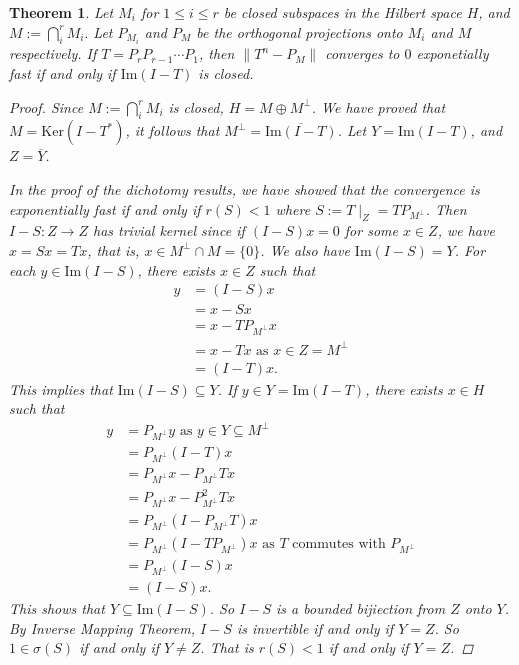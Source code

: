 \documentclass[11pt, a4paper]{amsart}
\newtheorem{theorem}{Theorem}
\begin{document}
\begin{theorem}
Let $M_i$ for $1\leq i\leq r$ be closed subspaces in the Hilbert space $H$, and $M:=\bigcap_{i}^r M_i.$ Let $P_{M_i}$ and $P_{M}$ be the orthogonal projections onto $M_i$ and $M$ respectively. If $T=P_rP_{r-1}\cdots P_1$, then $\|T^n-P_M\|$ converges to $0$ exponetially fast if and only if $\mathrm{Im}(I-T)$ is closed.
\begin{proof}
Since $M:=\bigcap_{i}^r M_i$ is closed, $H=M\oplus M^{\perp}$. We have proved that $M=\mathrm{Ker}(I-T^{\ast})$, it follows that $M^{\perp}=\overline{\mathrm{Im}(I-T)}$. Let $	Y=\mathrm{Im}(I-T)$, and $Z=\overline{Y}$.

In the proof of the \emph{dichotomy results}, we have showed that the convergence is exponentially fast if and only if $r(S)<1$ where $S:=T\mid_{Z}=TP_{M^{\perp}}$.
Then $I-S\colon Z\to Z$ has trivial kernel since if
$(I-S)x=0$ for some $x\in Z$, we have $x=Sx=Tx$, that is, $x\in M^{\perp}\cap M=\{0\}$. 
We also have $\mathrm{Im}(I-S)=Y$. For each $y\in \mathrm{Im}(I-S)$, there exists $x\in Z$ such that 
\begin{align*}
y&=(I-S)x\\
{}&=x-Sx \\
{}&=x-TP_{M^{\perp}}x \\
{}&=x-Tx  \mbox{ as } x\in Z=M^{\perp}\\
{}&=(I-T)x. 
\end{align*}
This implies that $\mathrm{Im}(I-S)\subseteq Y$.
If $y\in Y=\mathrm{Im}(I-T)$, there exists $x\in H$ such that 
\begin{align*}
y&=P_{M^{\perp}}y \mbox{ as } y\in Y\subseteq M^{\perp}\\
{}&=P_{M^{\perp}}(I-T)x \\
{}&=P_{M^{\perp}}x-P_{M^{\perp}}Tx \\
{}&=P_{M^{\perp}}x-P_{M^{\perp}}^{2}Tx \\
{}&=P_{M^{\perp}}(I-P_{M^{\perp}}T)x\\
{}&=P_{M^{\perp}}(I-TP_{M^{\perp}})x \mbox{ as } T \mbox{ commutes with } P_{M^{\perp}} \\
{}&=P_{M^{\perp}}(I-S)x \\
{}&=(I-S)x.
\end{align*}
This shows that $Y\subseteq \mathrm{Im}(I-S)$.
So $I-S$ is a bounded bijiection from $Z$ onto $Y$. By \emph{Inverse Mapping Theorem}, $I-S$ is invertible if and only if $Y=Z$. So $1\in \sigma(S)$ if and only if $Y\neq Z$. That is $r(S)<1$ if and only if $Y=Z$.
\end{proof}
\end{theorem}
\end{document}
